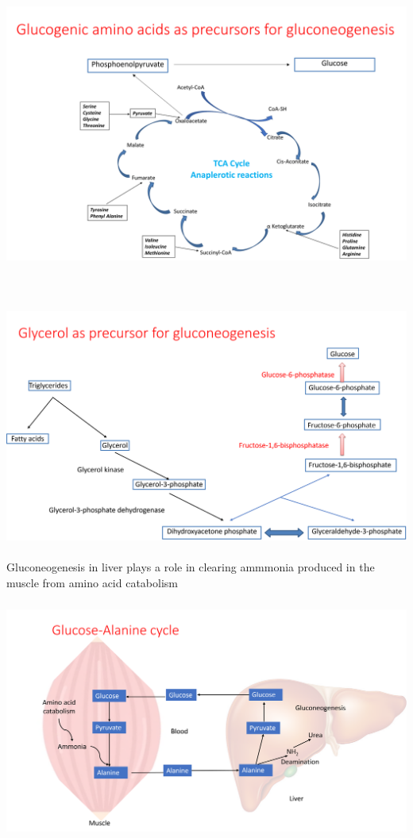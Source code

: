 \documentclass[
]{book}
\begin{document}
\includegraphics[width=\textwidth,height=4.16667in]{Images/aa.png}

\includegraphics[width=\textwidth,height=3.125in]{Images/glycerol.png}

Gluconeogenesis in liver plays a role in clearing ammmonia produced in the muscle from amino acid catabolism

\includegraphics[width=\textwidth,height=3.125in]{Images/alanine.png}
\end{document}
